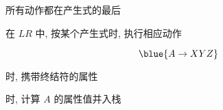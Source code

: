 \begin{frame}{}
  \begin{center}
  \end{center}
  
\end{frame}

\begin{frame}{}
  \begin{center}
    \begin{columns}
        \begin{center}
        \end{center}
        \begin{center}
        \end{center}
    \end{columns}

    \pause
    \vspace{0.80cm}
     所有动作都在产生式的最后

    \vspace{0.30cm}
    在 $LR$ 中, 按某个产生式时, 执行相应动作
  \end{center}
\end{frame}

\begin{frame}{}
  \begin{center}
    \[
      \blue{A \to X Y Z}
    \]


    时, 携带终结符的属性

    \vspace{0.30cm}
    时, 计算 $A$ 的属性值并入栈
  \end{center}
\end{frame}

\begin{frame}{}
  
\end{frame}


